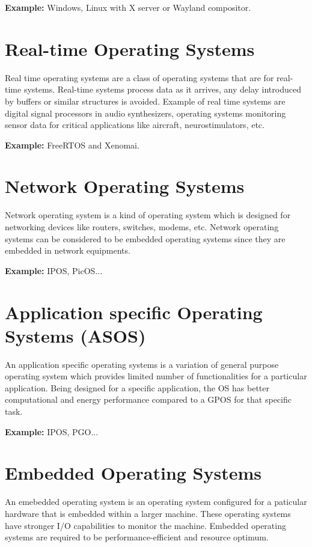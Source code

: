 \documentclass[a4,11pt]{article}
\begin{document}
\begin{multicols}{2}
  \textbf{Example:} Windows, Linux with X server or Wayland compositor.
  
  \section{Real-time Operating Systems}
  Real time operating systems are a class of operating systems that
  are for real-time systems. Real-time systems process data as it
  arrives, any delay introduced by buffers or similar structures is
  avoided. Example of real time systems are digital signal processors
  in audio synthesizers, operating systems monitoring sensor data for
  critical applications like aircraft, neurostimulators, etc.

  \textbf{Example:} FreeRTOS and Xenomai.
  
  \section{Network Operating Systems}
  Network operating system is a kind of operating system which is
  designed for networking devices like routers, switches, modems,
  etc. Network operating systems can be considered to be embedded
  operating systems since they are embedded in network equipments.

  \textbf{Example:} IPOS, PicOS...
  
  \section{Application specific Operating Systems (ASOS)}
  An application specific operating systems is a variation of general
  purpose operating system which provides limited number of
  functionalities for a particular application. Being designed for a
  specific application, the OS has better computational and energy
  performance compared to a GPOS for that specific task.

  \textbf{Example:} IPOS, PGO...
  
  \section{Embedded Operating Systems}
  An emebedded operating system is an operating system configured for
  a paticular hardware that is embedded within a larger machine. These
  operating systems have stronger I/O capabilities to monitor the
  machine. Embedded operating systems are required to be
  performance-efficient and resource optimum.
  

\end{multicols}
\end{document}
